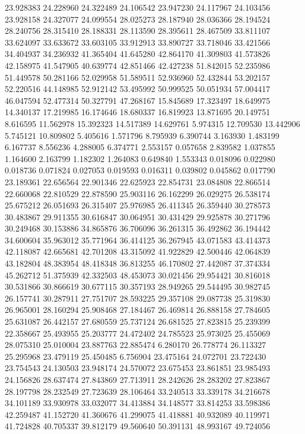 23.928383
24.228960
24.322489
24.106542
23.947230
24.117967
24.103456
23.928158
24.327077
24.099554
28.025273
28.187940
28.036366
28.194524
28.240756
28.315410
28.188331
28.113590
28.395611
28.467509
33.811107
33.624097
33.633672
33.603105
33.912913
33.890727
33.718046
33.421566
34.404937
34.236932
41.365404
41.645280
42.864170
41.309803
41.573826
42.158975
41.547905
40.639774
42.851466
42.427238
51.842015
52.235986
51.449578
50.281166
52.029958
51.589511
52.936960
52.432844
53.202157
52.220516
44.148985
52.912142
53.495992
50.999525
50.051934
57.004417
46.047594
52.477314
50.327791
47.268167
15.845689
17.323497
18.649975
14.340137
17.219985
16.174646
18.680337
16.819923
13.871695
20.149751
8.616595
11.562978
15.392323
14.517389
14.629761
5.974315
12.709530
13.442906
5.745121
10.809802
5.405616
1.571796
8.795939
6.390744
3.163930
1.483199
6.167737
8.556236
4.288005
6.374771
2.553157
0.057658
2.839582
1.037855
1.164600
2.163799
1.182302
1.264083
0.649840
1.553343
0.018096
0.022980
0.018736
0.071824
0.027053
0.019593
0.016311
0.039802
0.045862
0.017790
23.189361
22.656564
22.901346
22.625923
22.854731
23.084808
22.866514
22.660068
22.810529
22.878590
25.903116
26.162299
26.029275
26.538174
25.675212
26.051693
26.315407
25.976985
26.411345
26.359440
30.278573
30.483867
29.911355
30.616847
30.064951
30.431429
29.925878
30.271796
30.249468
30.153886
34.865876
36.706096
36.261315
36.492862
36.194442
34.600604
35.963012
35.771964
36.414125
36.267945
43.071583
43.414373
42.118087
42.665681
42.701208
43.315092
41.922829
42.500446
42.064839
43.182804
48.383954
48.418348
36.813255
46.170802
27.442087
37.374334
45.262712
51.375939
42.332503
48.453073
30.021456
29.954421
30.816018
30.531866
30.866619
30.677115
30.357193
28.949265
29.544495
30.982745
26.157741
30.287911
27.751707
28.593225
29.357108
29.087738
25.319830
26.965001
28.160294
25.908468
27.184467
26.469814
26.888158
27.784605
25.631087
26.442157
27.680559
25.737124
26.681525
27.823815
25.239399
22.358667
25.493955
25.203777
24.472402
24.785523
25.973025
25.455069
28.075310
25.010004
23.887763
22.885474
6.280170
26.778774
26.113327
25.295968
23.479119
25.450485
6.756904
23.475164
24.072701
23.722430
23.754543
24.130503
23.948174
24.570072
23.675453
23.861851
23.985493
24.156826
28.637474
27.843869
27.713911
28.242626
28.283202
27.823867
28.197798
28.232549
27.723639
28.106464
33.240513
33.339178
34.216678
34.101189
33.930978
33.032077
34.413884
34.148577
33.814253
33.598386
42.259487
41.152720
41.360676
41.299075
41.418881
40.932089
40.119971
41.724828
40.705337
39.812179
49.560640
50.391131
48.993167
49.724056
